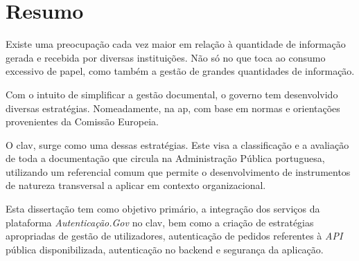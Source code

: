 \chapter*{Resumo}

Existe uma preocupação cada vez maior em relação à quantidade de informação gerada e recebida por diversas instituições. Não só no que toca ao consumo excessivo de papel, como também a gestão de grandes quantidades de informação.

Com o intuito de simplificar a gestão documental, o governo tem desenvolvido diversas estratégias. Nomeadamente, na \gls{ap}, com base em normas e orientações provenientes da Comissão Europeia.

O \gls{clav}, surge como uma dessas estratégias. Este visa a classificação e a avaliação de toda a documentação que circula na Administração Pública portuguesa, utilizando um referencial comum que permite o desenvolvimento de instrumentos de natureza transversal a aplicar em contexto organizacional.

Esta dissertação tem como objetivo primário, a integração dos serviços da plataforma \emph{Autenticação.Gov} no \gls{clav}, bem como a criação de estratégias apropriadas de gestão de utilizadores, autenticação de pedidos referentes à \emph{API} pública disponibilizada, autenticação no backend e segurança da aplicação.

\vspace{5cm}
